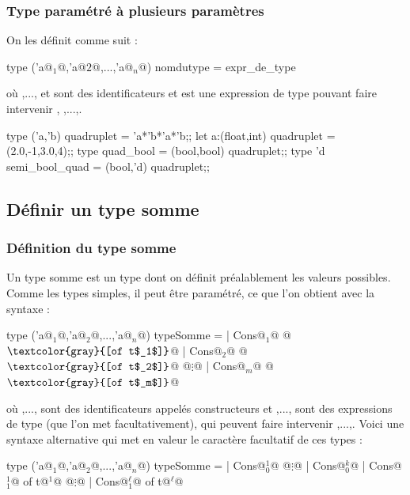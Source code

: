 		\subsubsection{Type paramétré à plusieurs paramètres}
			
			\begin{Syntaxe}
				On les définit comme suit : 
					\begin{Caml}
			    type ('a@$_1$@,'a@$2$@,...,'a@$_n$@) nomdutype = expr_de_type
					\end{Caml}
				où ,..., et  sont des identificateurs et  est une expression de type pouvant faire intervenir , ,...,.
			\end{Syntaxe}
		
			\begin{Exemple} 
				\begin{Caml}
		   type ('a,'b) quadruplet = 'a*'b*'a*'b;;
		   let a:(float,int) quadruplet = (2.0,-1,3.0,4);;
		   type quad_bool = (bool,bool) quadruplet;;
		   type 'd semi_bool_quad = (bool,'d) quadruplet;;
				\end{Caml}
			\end{Exemple}
		
	\subsection{Définir un type somme}
		
		\subsubsection{Définition du type somme}
		
		\begin{Syntaxe}
			Un type somme est un type dont on définit préalablement les valeurs possibles. Comme les types simples, il peut être paramétré, ce que l'on obtient avec la syntaxe : 
				\begin{Caml}
					  type ('a@$_1$@,'a@$_2$@,...,'a@$_n$@) typeSomme =
						  | Cons@$_1$@ @$\text{\texttt{\textcolor{gray}{[of t$_1$]}}}$@
						  | Cons@$_2$@ @$\text{\texttt{\textcolor{gray}{[of t$_2$]}}}$@
						      @$\vdots$@
						  | Cons@$_m$@ @$\text{\texttt{\textcolor{gray}{[of t$_m$]}}}$@
				\end{Caml}
			où ,..., sont des identificateurs appelés constructeurs et ,..., sont des expressions de type (que l'on met facultativement), qui peuvent faire intervenir ,...,. \nt
			Voici une syntaxe alternative qui met en valeur le caractère facultatif de ces types : 
				\begin{Caml}
					  type ('a@$_1$@,'a@$_2$@,...,'a@$_n$@) typeSomme =
						  | Cons@$^1_0$@
						      @$\vdots$@
						  | Cons@$^k_0$@
						  | Cons@$^1_1$@ of t@$^1$@
						      @$\vdots$@
						  | Cons@$^\ell_1$@ of t@$^\ell$@
				\end{Caml}
		\end{Syntaxe}
	
